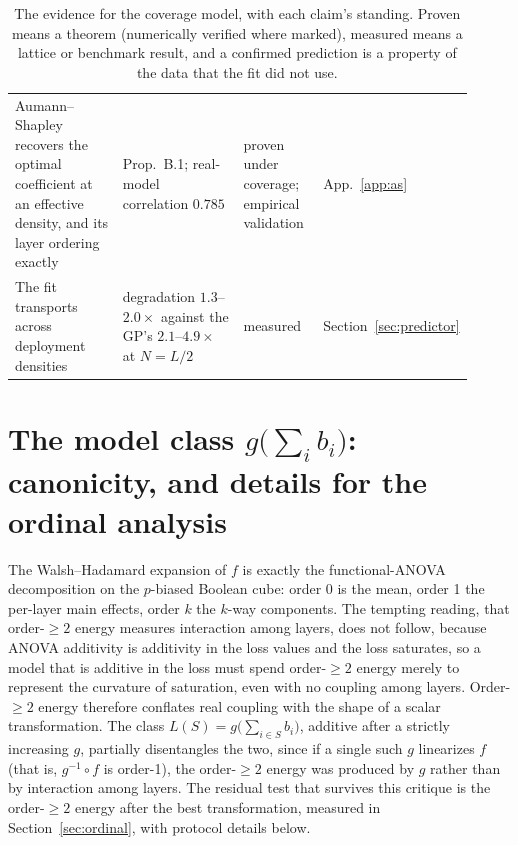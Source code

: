 \begin{table}[h]
\begin{tabular}{@{}p{0.26\linewidth}p{0.30\linewidth}p{0.18\linewidth}p{0.17\linewidth}@{}}
    Aumann--Shapley recovers the optimal coefficient at an effective density, and its layer ordering exactly & Prop.~B.1; real-model correlation $0.785$ & proven under coverage; empirical validation & App.~\ref{app:as} \\
    The fit transports across deployment densities & degradation $1.3$--$2.0\times$ against the GP's $2.1$--$4.9\times$ at $N=L/2$ & measured & Section~\ref{sec:predictor} \\
    \bottomrule
  \end{tabular}
  \caption{The evidence for the coverage model, with each claim's standing. Proven means a theorem
  (numerically verified where marked),
  measured means a lattice or benchmark result, and a confirmed prediction is a property of the data
  that the fit did not use.}
  \label{tab:evidence}
\end{table}

\section{The model class $g\bigl(\sum_i b_i\bigr)$: canonicity, and details for the ordinal
analysis}\label{app:link}

The Walsh--Hadamard expansion of $f$ is exactly the functional-ANOVA decomposition on the
$p$-biased Boolean cube: order 0 is the mean, order 1 the per-layer main effects, order $k$ the $k$-way
components. The tempting reading, that order-$\ge 2$ energy measures interaction among layers, does
not follow, because ANOVA additivity is additivity in the loss values and the loss saturates, so a model
that is additive in the loss must spend order-$\ge 2$ energy merely to represent the curvature of
saturation, even with no coupling among layers. Order-$\ge 2$ energy therefore conflates real coupling
with the shape of a scalar transformation. The class $L(S)=g\bigl(\sum_{i\in S} b_i\bigr)$, additive after
a strictly increasing $g$, partially disentangles the two, since if a single such $g$ linearizes $f$ (that is,
$g^{-1}\circ f$ is order-1), the order-$\ge 2$ energy was produced by $g$ rather than by interaction among
layers.
The residual test that survives this critique is the order-$\ge 2$
energy after the best transformation, measured in Section~\ref{sec:ordinal}, with protocol details below.

